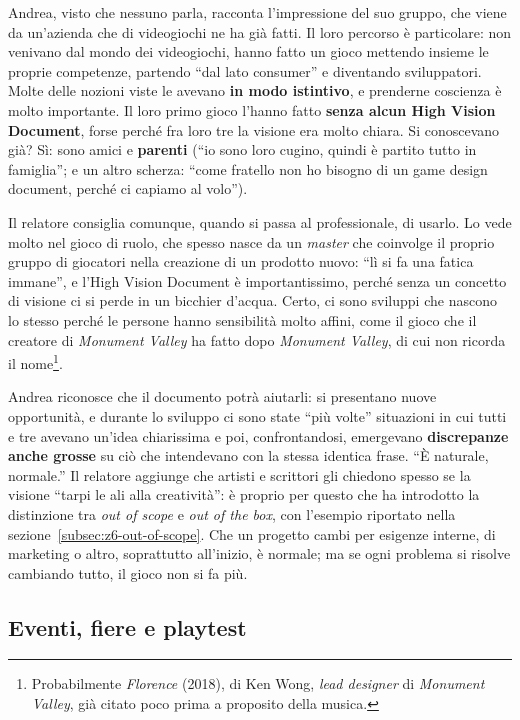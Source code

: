 Andrea, visto che nessuno parla, racconta l'impressione del suo gruppo, che
viene da un'azienda che di videogiochi ne ha già fatti. Il loro percorso è
particolare: non venivano dal mondo dei videogiochi, hanno fatto un gioco
mettendo insieme le proprie competenze, partendo ``dal lato consumer'' e
diventando sviluppatori. Molte delle nozioni viste le avevano \textbf{in modo
istintivo}, e prenderne coscienza è molto importante. Il loro primo gioco l'hanno
fatto \textbf{senza alcun High Vision Document}, forse perché fra loro tre la
visione era molto chiara. Si conoscevano già? Sì: sono amici e \textbf{parenti}
(``io sono loro cugino, quindi è partito tutto in famiglia''; e un altro
scherza: ``come fratello non ho bisogno di un game design document, perché ci
capiamo al volo'').

Il relatore consiglia comunque, quando si passa al professionale, di usarlo. Lo
vede molto nel gioco di ruolo, che spesso nasce da un \emph{master} che coinvolge
il proprio gruppo di giocatori nella creazione di un prodotto nuovo: ``lì si fa
una fatica immane'', e l'High Vision Document è importantissimo, perché senza un
concetto di visione ci si perde in un bicchier d'acqua. Certo, ci sono sviluppi
che nascono lo stesso perché le persone hanno sensibilità molto affini, come il
gioco che il creatore di \emph{Monument Valley} ha fatto dopo \emph{Monument
Valley}, di cui non ricorda il nome\footnote{Probabilmente \emph{Florence}
(2018), di Ken Wong, \emph{lead designer} di \emph{Monument Valley}, già citato
poco prima a proposito della musica.}.

Andrea riconosce che il documento potrà aiutarli: si presentano nuove opportunità,
e durante lo sviluppo ci sono state ``più volte'' situazioni in cui tutti e tre
avevano un'idea chiarissima e poi, confrontandosi, emergevano \textbf{discrepanze
anche grosse} su ciò che intendevano con la stessa identica frase. ``È naturale,
normale.'' Il relatore aggiunge che artisti e scrittori gli chiedono spesso se
la visione ``tarpi le ali alla creatività'': è proprio per questo che ha
introdotto la distinzione tra \emph{out of scope} e \emph{out of the box}, con
l'esempio riportato nella sezione~\ref{subsec:z6-out-of-scope}. Che un progetto
cambi per esigenze interne, di marketing o altro, soprattutto all'inizio, è
normale; ma se ogni problema si risolve cambiando tutto, il gioco non si fa più.

\subsection{Eventi, fiere e playtest}

